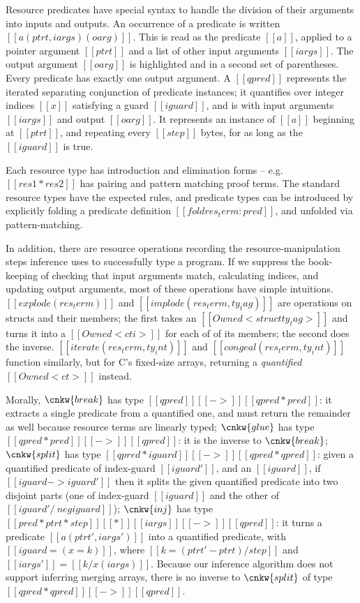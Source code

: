 \documentclass[11pt]{article}%
\begin{document}
Resource predicates have special syntax to handle the division of their
arguments into inputs and outputs. An occurrence of a predicate is written
$[[ a ( ptrt , iargs ) ( oarg )]]$. This is read as the predicate $[[ a ]]$,
applied to a pointer argument $[[ ptrt ]]$ and a list of other input arguments
$[[ iargs ]]$. The output argument $[[ oarg ]]$ is
\colorbox{red!10}{highlighted} and in a second set of parentheses. Every
predicate has exactly one output argument.
%
A $[[ qpred ]]$ represents the iterated separating conjunction of predicate
instances; it quantifies over integer indices $[[ x ]]$ satisfying a guard $[[
iguard ]]$, and is with input arguments $[[ iargs ]]$ and output $[[ oarg ]]$.
It represents an instance of $[[ a ]]$ beginning at $[[ ptrt ]]$, and repeating
every $[[ step ]]$ bytes, for as long as the $[[ iguard ]]$ is true.


Each resource type has introduction and elimination forms -- e.g.
$[[ res1 * res2 ]]$ has pairing and pattern matching proof terms. The
standard resource types have the expected rules, and predicate types
can be introduced by explicitly folding a predicate definition
$[[ fold res_term : pred ]]$, and unfolded via pattern-matching.


In addition, there are resource operations recording the
resource-manipulation steps inference uses to successfully type a
program.  If we suppress the book-keeping of checking that input
arguments match, calculating indices, and updating output arguments,
most of these operations have simple intuitions.
%
$[[ explode ( res_term ) ]]$ and $[[ implode ( res_term , ty_tag ) ]]$
are operations on structs and their members; the first takes an
$[[ Owned < struct ty_tag > ]]$ and turns it into a
$[[ Owned < cti > ]]$ for each of of its members; the second does the
inverse.  $[[ iterate ( res_term , ty_int ) ]]$ and
$[[ congeal ( res_term , ty_int ) ]]$ function similarly, but for C's
fixed-size arrays, returning a \emph{quantified} $[[ Owned < ct > ]]$
instead.

Morally,
$\cnkw{break}$ has type $[[ qpred ]] [[ -> ]] [[ qpred * pred ]]$: it
extracts a single predicate from a quantified one, and must return the
remainder as well because resource terms are linearly typed;
$\cnkw{glue}$ has type $[[ qpred * pred ]] [[ -> ]] [[ qpred ]]$: it
is the inverse to $\cnkw{break}$; $\cnkw{split}$ has type
$[[ qpred * iguard ]] [[ -> ]] [[ qpred * qpred ]]$: given a
quantified predicate of index-guard $[[ iguard' ]]$, and an
$[[ iguard ]]$, if $[[ iguard -> iguard' ]]$ then it splits the given
quantified predicate into two disjoint parts (one of index-guard
$[[ iguard ]]$ and the other of $[[ iguard' /\ neg iguard ]]$);
$\cnkw{inj}$ has type
$[[ pred * ptrt * step ]] [[ * ]] [[ iargs ]] [[ -> ]] [[ qpred ]]$:
it turns a predicate $[[ a ( ptrt' , iargs' ) ]]$ into a quantified
predicate, with $[[ iguard = ( x = k ) ]]$, where
$[[ k = ( ptrt' - ptrt ) / step ]]$ and
$[[ iargs' ]] = [[ k / x ( iargs ) ]]$. Because our inference
algorithm does not support inferring merging
arrays, there is no inverse to
$\cnkw{split}$ of type $[[ qpred * qpred ]] [[ -> ]] [[ qpred ]]$.
\end{document}
